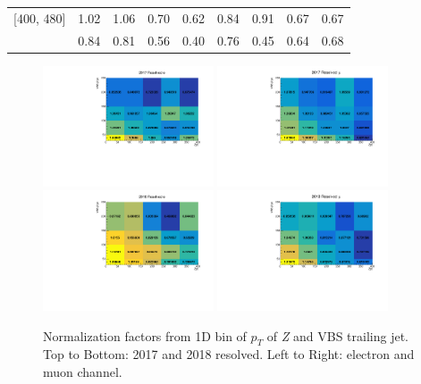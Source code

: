 \begin{table}
\begin{tabular}{lcccccccc}
    [400, 480]             & 1.02                         & 1.06                        & 0.70                     & 0.62                     & 0.84    & 0.91      & 0.67    & 0.67      \\\relax
    [480, inf]             & 0.84                         & 0.81                        & 0.56                     & 0.40                     & 0.76    & 0.45      & 0.64    & 0.68      \\
    \bottomrule
  \end{tabular}\label{tab:norm-factors}
\end{table}

\begin{figure}
  \centering
  \includegraphics[width=0.45\textwidth]{analysis_plots/dyjet_norm_2d/cr_vjets_e_sf_from_2017_zjj.pdf}
  \includegraphics[width=0.45\textwidth]{analysis_plots/dyjet_norm_2d/cr_vjets_mu_sf_from_2017_zjj.pdf}\\
  \includegraphics[width=0.45\textwidth]{analysis_plots/dyjet_norm_2d/cr_vjets_e_sf_from_2018_zjj.pdf}
  \includegraphics[width=0.45\textwidth]{analysis_plots/dyjet_norm_2d/cr_vjets_mu_sf_from_2018_zjj.pdf}
  \caption[Normalization factors from 1D bin of \( p_T \) of \textit{Z}
    and VBS trailing jet]%
  {Normalization factors from 1D bin of \( p_T \) of \textit{Z}
    and VBS trailing jet. Top to Bottom: 2017 and 2018 resolved.
    Left to Right: electron and muon channel.}%
  \label{fig:norm-factors-2d}
\end{figure}


